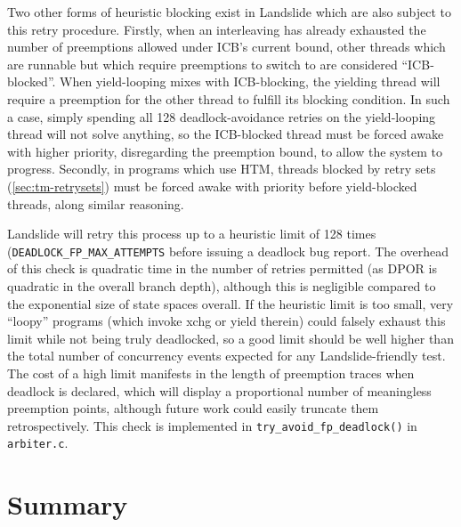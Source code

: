 Two other forms of heuristic blocking exist in Landslide which are also subject to this retry procedure.
Firstly, when an interleaving has already exhausted the number of preemptions allowed under ICB's current bound,
other threads which are runnable but which require preemptions to switch to are considered ``ICB-blocked''.
When yield-looping mixes with ICB-blocking, the yielding thread will require a preemption
for the other thread to fulfill its blocking condition.
In such a case, simply spending all 128 deadlock-avoidance retries on the yield-looping thread will not solve anything,
so the ICB-blocked thread must be forced awake with higher priority,
disregarding the preemption bound,
to allow the system to progress.
Secondly, in programs which use HTM,
threads blocked by retry sets (\cref{sec:tm-retrysets})
must be forced awake with priority before yield-blocked threads,
along similar reasoning.

Landslide will retry this process up to a heuristic limit of 128 times ({\tt DEADLOCK\_FP\_MAX\_\allowbreak{}ATTEMPTS}
before issuing a deadlock bug report.
The overhead of this check is quadratic time in the number of retries permitted
(as DPOR is quadratic in the overall branch depth),
although this is negligible compared to the exponential size of state spaces overall.
If the heuristic limit is too small, very ``loopy'' programs
(which invoke xchg or yield therein)
could falsely exhaust this limit while not being truly deadlocked,
so a good limit should be well higher than the total number of concurrency events expected for any Landslide-friendly test.
The cost of a high limit manifests in the length of preemption traces when deadlock is declared,
which will display a proportional number of meaningless preemption points,
although future work could easily truncate them retrospectively.
This check is implemented in {\tt try\_avoid\_fp\_deadlock()} in {\tt arbiter.c}.


\section{Summary}

